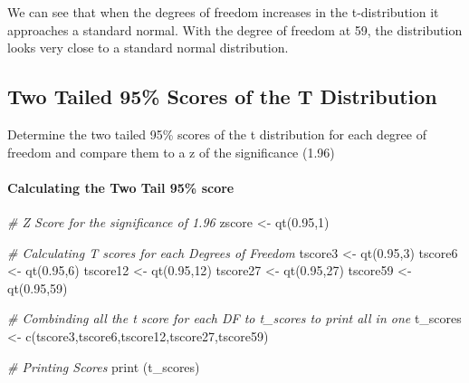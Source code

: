 \documentclass[
]{article}
\newenvironment{Shaded}{\begin{snugshade}}{\end{snugshade}}
\newcommand{\CommentTok}[1]{\textcolor[rgb]{0.56,0.35,0.01}{\textit{#1}}}
\newcommand{\DecValTok}[1]{\textcolor[rgb]{0.00,0.00,0.81}{#1}}
\newcommand{\FloatTok}[1]{\textcolor[rgb]{0.00,0.00,0.81}{#1}}
\newcommand{\FunctionTok}[1]{\textcolor[rgb]{0.00,0.00,0.00}{#1}}
\newcommand{\NormalTok}[1]{#1}
\newcommand{\OtherTok}[1]{\textcolor[rgb]{0.56,0.35,0.01}{#1}}
\begin{document}
We can see that when the degrees of freedom increases in the
t-distribution it approaches a standard normal. With the degree of
freedom at 59, the distribution looks very close to a standard normal
distribution.

\hypertarget{two-tailed-95-scores-of-the-t-distribution}{%
\subsection{Two Tailed 95\% Scores of the T
Distribution}\label{two-tailed-95-scores-of-the-t-distribution}}

Determine the two tailed 95\% scores of the t distribution for each
degree of freedom and compare them to a z of the significance (1.96)

\hypertarget{calculating-the-two-tail-95-score}{%
\paragraph{Calculating the Two Tail 95\%
score}\label{calculating-the-two-tail-95-score}}

\begin{Shaded}
\begin{Highlighting}[]
\CommentTok{\# Z Score for the significance of 1.96}
\NormalTok{zscore }\OtherTok{\textless{}{-}} \FunctionTok{qt}\NormalTok{(}\FloatTok{0.95}\NormalTok{,}\DecValTok{1}\NormalTok{)}

\CommentTok{\# Calculating T scores for each Degrees of Freedom}
\NormalTok{tscore3 }\OtherTok{\textless{}{-}} \FunctionTok{qt}\NormalTok{(}\FloatTok{0.95}\NormalTok{,}\DecValTok{3}\NormalTok{)}
\NormalTok{tscore6 }\OtherTok{\textless{}{-}} \FunctionTok{qt}\NormalTok{(}\FloatTok{0.95}\NormalTok{,}\DecValTok{6}\NormalTok{)}
\NormalTok{tscore12 }\OtherTok{\textless{}{-}} \FunctionTok{qt}\NormalTok{(}\FloatTok{0.95}\NormalTok{,}\DecValTok{12}\NormalTok{)}
\NormalTok{tscore27 }\OtherTok{\textless{}{-}} \FunctionTok{qt}\NormalTok{(}\FloatTok{0.95}\NormalTok{,}\DecValTok{27}\NormalTok{)}
\NormalTok{tscore59 }\OtherTok{\textless{}{-}} \FunctionTok{qt}\NormalTok{(}\FloatTok{0.95}\NormalTok{,}\DecValTok{59}\NormalTok{)}

\CommentTok{\# Combinding all the t score for each DF to t\_scores to print all in one}
\NormalTok{t\_scores }\OtherTok{\textless{}{-}} \FunctionTok{c}\NormalTok{(tscore3,tscore6,tscore12,tscore27,tscore59)}

\CommentTok{\# Printing Scores}
\FunctionTok{print}\NormalTok{ (t\_scores)}
\end{Highlighting}
\end{Shaded}
\end{document}
